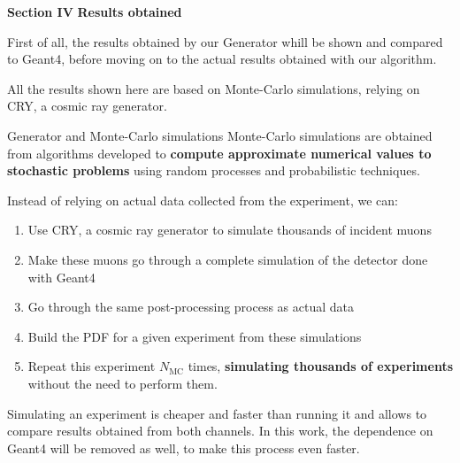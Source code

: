 \documentclass[handout,8 pt]{beamer}
\begin{document}
\begin{frame}{}
\centering
	\huge{\textbf{\color{mycolor} Section IV}} \newline
	\LARGE{\textbf{\color{mycolor} Results obtained \color{black}}} \vfill
\Large{First of all, the results obtained by our Generator whill be shown and compared to Geant4, before moving on to the actual results obtained with our algorithm. \\ \vspace{10pt}

All the results shown here are based on Monte-Carlo simulations, relying on CRY, a cosmic ray generator.} \vfill
\end{frame}

\begin{frame}{Generator and Monte-Carlo simulations}
\justifying
Monte-Carlo simulations are obtained from algorithms developed to \textbf{compute approximate numerical values to stochastic problems} using random processes and probabilistic techniques. \vfill

Instead of relying on actual data collected from the experiment, we can:
\begin{enumerate}
\justifying
\item Use CRY, a cosmic ray generator to simulate thousands of incident muons
\item Make these muons go through a complete simulation of the detector done with Geant4
\item Go through the same post-processing process as actual data
\item Build the PDF for a given experiment from these simulations
\item Repeat this experiment $N_\text{MC}$ times, \textbf{simulating thousands of experiments} without the need to perform them.
\end{enumerate} \vfill

Simulating an experiment is cheaper and faster than running it and allows to compare results obtained from both channels. In this work, the dependence on Geant4 will be removed as well, to make this process even faster. \vfill
\end{frame}
\end{document}
